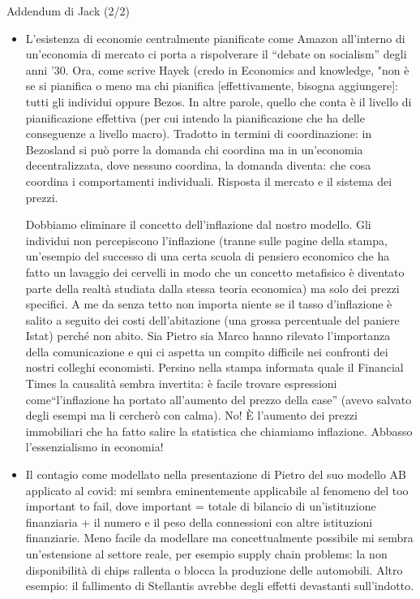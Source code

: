 \documentclass[9pt]{beamer}
\begin{document}
\begin{frame}{Addendum di Jack (2/2)}

\scriptsize

\begin{itemize}

\item
L'esistenza di economie centralmente pianificate come Amazon all'interno di un'economia di mercato ci porta a rispolverare il ``debate on socialism'' degli anni '30. Ora, come scrive Hayek (credo in Economics and knowledge, "non \`{e} se si pianifica o meno ma chi pianifica [effettivamente, bisogna aggiungere]: tutti gli individui oppure Bezos. In altre parole, quello che conta \`{e} il livello di pianificazione effettiva (per cui intendo la pianificazione che ha delle conseguenze a livello macro). Tradotto in termini di coordinazione: in Bezosland si pu\`{o} porre la domanda chi coordina ma in un'economia decentralizzata, dove nessuno coordina, la domanda diventa: che cosa coordina i comportamenti individuali. Risposta il mercato e il sistema dei prezzi.

Dobbiamo eliminare il concetto dell'inflazione dal nostro modello. Gli individui non percepiscono l'inflazione (tranne sulle pagine della stampa, un'esempio del successo di una certa scuola di pensiero economico che ha fatto un lavaggio dei cervelli in modo che un concetto metafisico \`{e} diventato parte della realt\`{a} studiata dalla stessa teoria economica) ma solo dei prezzi specifici. A me da senza tetto non importa niente se il tasso d'inflazione \`{e} salito a seguito dei costi dell'abitazione (una grossa percentuale del paniere Istat) perch\'{e} non abito. Sia Pietro sia Marco hanno rilevato l'importanza della comunicazione e qui ci aspetta un compito difficile nei confronti dei nostri colleghi economisti. Persino nella stampa informata quale il Financial Times la causalit\`{a} sembra invertita: \`{e} facile trovare espressioni come``l'inflazione ha portato all'aumento del prezzo della case'' (avevo salvato degli esempi ma li cercher\`{o} con calma). No! \`{E} l'aumento dei prezzi immobiliari che ha fatto salire la statistica che chiamiamo inflazione. Abbasso l'essenzialismo in economia!


\item
Il contagio come modellato nella presentazione di Pietro del suo modello AB applicato al covid: mi sembra eminentemente applicabile al fenomeno del too important to fail, dove important = totale di bilancio di un'istituzione finanziaria + il numero e il peso della connessioni con altre istituzioni finanziarie. Meno facile da modellare ma concettualmente possibile mi sembra un'estensione al settore reale, per esempio supply chain problems: la non disponibilit\`{a} di chips rallenta o blocca la produzione delle automobili. Altro esempio: il fallimento di Stellantis avrebbe degli effetti devastanti sull'indotto.

\end{itemize}

\end{frame}
\end{document}
